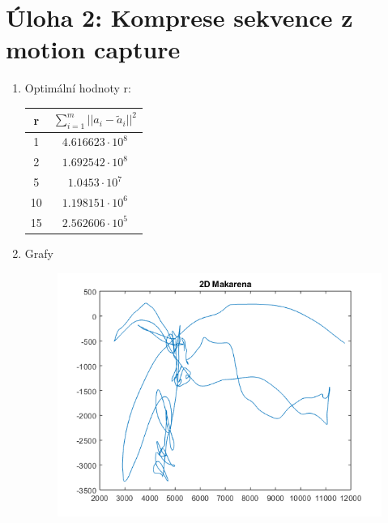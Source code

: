 \documentclass[12pt]{article}
\newcommand\T{\rule{0pt}{2.6ex}}       %
\newcommand\B{\rule[-1.2ex]{0pt}{0pt}} %
\begin{document}
\section{Úloha 2: Komprese sekvence z motion capture}
\begin{enumerate}
\item Optimální hodnoty r:
\begin{center}
\begin{tabular}{|c|c|}
\hline
r & $\sum_{i=1}^{m} ||a_i-\tilde{a}_i||^2$\T\B \\
\hline
 1 & $4.616623 \cdot 10^8$ \\
 2 & $1.692542 \cdot 10^8$ \\
 5 & $1.0453 \cdot 10^7$ \\
 10 & $1.198151 \cdot 10^6$ \\
 15 & $2.562606 \cdot 10^5$ \\
\hline
\end{tabular}
\end{center}

\item Grafy
\begin{figure}[H]
	\centering
	\includegraphics{makarena_2d.png}
\end{figure}
\noindent


\end{enumerate}
\end{document}
